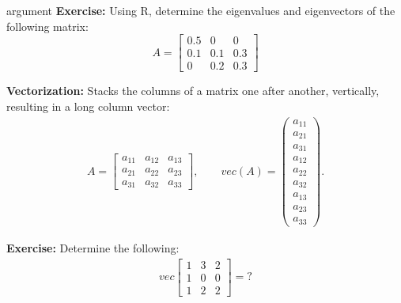 \begin{labeling}{argument}
    \textbf{Exercise:} Using R, determine the eigenvalues and eigenvectors of the following matrix:
    \[
        A = \begin{bmatrix}
            0.5 & 0   & 0   \\
            0.1 & 0.1 & 0.3 \\
            0   & 0.2 & 0.3
        \end{bmatrix}
    \]

    \begin{sol}
        
    \end{sol}

    \item[\textbf{Vectorization:}] Stacks the columns of a matrix one after another, vertically, resulting in a long column vector:
    \begin{align*}
        A
        = \begin{bmatrix}
              a_{11} & a_{12} & a_{13} \\
              a_{21} & a_{22} & a_{23} \\
              a_{31} & a_{32} & a_{33}
          \end{bmatrix},
        \quad \quad
        vec(A)
        = \begin{pmatrix}
              a_{11} \\ a_{21} \\ a_{31} \\
              a_{12} \\ a_{22} \\ a_{32} \\
              a_{13} \\ a_{23} \\ a_{33}
          \end{pmatrix}.
    \end{align*}

    \textbf{Exercise:} Determine the following:
    \begin{align*}
        vec \begin{bmatrix}
                1 & 3 & 2 \\
                1 & 0 & 0 \\
                1 & 2 & 2
            \end{bmatrix}
        =
        ?
    \end{align*}


\end{labeling}
